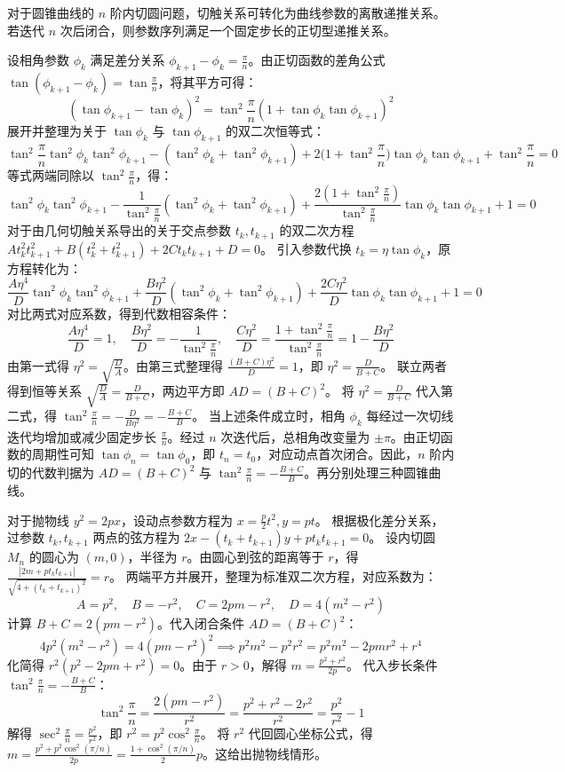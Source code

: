 \begin{solution}
对于圆锥曲线的 $n$ 阶内切圆问题，切触关系可转化为曲线参数的离散递推关系。若迭代 $n$ 次后闭合，则参数序列满足一个固定步长的正切型递推关系。

设相角参数 $\phi_k$ 满足差分关系 $\phi_{k+1} - \phi_k = \frac{\pi}{n}$。由正切函数的差角公式 $\tan(\phi_{k+1}-\phi_k) = \tan\frac{\pi}{n}$，将其平方可得：
$$ (\tan\phi_{k+1} - \tan\phi_k)^2 = \tan^2\frac{\pi}{n} (1 + \tan\phi_k \tan\phi_{k+1})^2 $$
展开并整理为关于 $\tan\phi_k$ 与 $\tan\phi_{k+1}$ 的双二次恒等式：
$$ \tan^2\frac{\pi}{n} \tan^2\phi_k \tan^2\phi_{k+1} - (\tan^2\phi_k + \tan^2\phi_{k+1}) + 2\Big(1+\tan^2\frac{\pi}{n}\Big)\tan\phi_k \tan\phi_{k+1} + \tan^2\frac{\pi}{n} = 0 $$
等式两端同除以 $\tan^2\frac{\pi}{n}$，得：
$$ \tan^2\phi_k \tan^2\phi_{k+1} - \frac{1}{\tan^2\frac{\pi}{n}}(\tan^2\phi_k + \tan^2\phi_{k+1}) + \frac{2(1+\tan^2\frac{\pi}{n})}{\tan^2\frac{\pi}{n}}\tan\phi_k \tan\phi_{k+1} + 1 = 0 $$
对于由几何切触关系导出的关于交点参数 $t_k, t_{k+1}$ 的双二次方程 $A t_k^2 t_{k+1}^2 + B(t_k^2+t_{k+1}^2) + 2C t_k t_{k+1} + D = 0$。
引入参数代换 $t_k = \eta \tan\phi_k$，原方程转化为：
$$ \frac{A\eta^4}{D} \tan^2\phi_k \tan^2\phi_{k+1} + \frac{B\eta^2}{D}(\tan^2\phi_k + \tan^2\phi_{k+1}) + \frac{2C\eta^2}{D} \tan\phi_k \tan\phi_{k+1} + 1 = 0 $$
对比两式对应系数，得到代数相容条件：
$$ \frac{A\eta^4}{D} = 1, \quad \frac{B\eta^2}{D} = -\frac{1}{\tan^2\frac{\pi}{n}}, \quad \frac{C\eta^2}{D} = \frac{1+\tan^2\frac{\pi}{n}}{\tan^2\frac{\pi}{n}} = 1 - \frac{B\eta^2}{D} $$
由第一式得 $\eta^2 = \sqrt{\frac{D}{A}}$。由第三式整理得 $\frac{(B+C)\eta^2}{D} = 1$，即 $\eta^2 = \frac{D}{B+C}$。
联立两者得到恒等关系 $\sqrt{\frac{D}{A}} = \frac{D}{B+C}$，两边平方即 $AD = (B+C)^2$。
将 $\eta^2 = \frac{D}{B+C}$ 代入第二式，得 $\tan^2\frac{\pi}{n} = -\frac{D}{B\eta^2} = -\frac{B+C}{B}$。
当上述条件成立时，相角 $\phi_k$ 每经过一次切线迭代均增加或减少固定步长 $\frac{\pi}{n}$。经过 $n$ 次迭代后，总相角改变量为 $\pm \pi$。由正切函数的周期性可知 $\tan\phi_n = \tan\phi_0$，即 $t_n = t_0$，对应动点首次闭合。因此，$n$ 阶内切的代数判据为 $AD = (B+C)^2$ 与 $\tan^2\frac{\pi}{n} = -\frac{B+C}{B}$。再分别处理三种圆锥曲线。

对于抛物线 $y^2=2px$，设动点参数方程为 $x = \frac{p}{2}t^2, y = pt$。
根据极化差分关系，过参数 $t_k, t_{k+1}$ 两点的弦方程为 $2x - (t_k+t_{k+1})y + p t_k t_{k+1} = 0$。
设内切圆 $M_n$ 的圆心为 $(m,0)$，半径为 $r$。由圆心到弦的距离等于 $r$，得 $\frac{|2m + p t_k t_{k+1}|}{\sqrt{4 + (t_k+t_{k+1})^2}} = r$。
两端平方并展开，整理为标准双二次方程，对应系数为：
$$ A = p^2, \quad B = -r^2, \quad C = 2pm - r^2, \quad D = 4(m^2-r^2) $$
计算 $B+C = 2(pm - r^2)$。代入闭合条件 $AD = (B+C)^2$：
$$ 4p^2(m^2-r^2) = 4(pm-r^2)^2 \implies p^2m^2 - p^2r^2 = p^2m^2 - 2pmr^2 + r^4 $$
化简得 $r^2(p^2 - 2pm + r^2) = 0$。由于 $r > 0$，解得 $m = \frac{p^2+r^2}{2p}$。
代入步长条件 $\tan^2\frac{\pi}{n} = -\frac{B+C}{B}$：
$$ \tan^2\frac{\pi}{n} = \frac{2(pm-r^2)}{r^2} = \frac{p^2+r^2-2r^2}{r^2} = \frac{p^2}{r^2} - 1 $$
解得 $\sec^2\frac{\pi}{n} = \frac{p^2}{r^2}$，即 $r^2 = p^2\cos^2\frac{\pi}{n}$。
将 $r^2$ 代回圆心坐标公式，得 $m = \frac{p^2 + p^2\cos^2(\pi/n)}{2p} = \frac{1+\cos^2(\pi/n)}{2}p$。这给出抛物线情形。


\end{solution}
